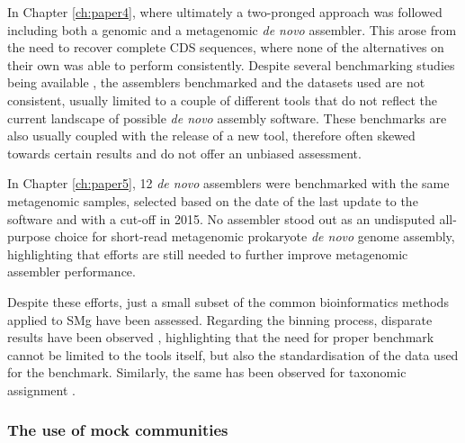 In Chapter \ref{ch:paper4}, where ultimately a two-pronged approach was followed including both a genomic and a metagenomic \textit{de novo} assembler. This arose from the need to recover complete CDS sequences, where none of the alternatives on their own was able to perform consistently. Despite several benchmarking studies being available \citep{miller_assembly_2010, earl_assemblathon_2011, bradnam_assemblathon_2013, liao_current_2019, chen_benchmarking_2020, sczyrba_critical_2017, meyer_critical_2022}, the assemblers benchmarked and the datasets used are not consistent, usually limited to a couple of different tools that do not reflect the current landscape of possible \textit{de novo} assembly software. These benchmarks are also usually coupled with the release of a new tool, therefore often skewed towards certain results and do not offer an unbiased assessment. 

In Chapter \ref{ch:paper5}, 12 \textit{de novo} assemblers were benchmarked with the same metagenomic samples, selected based on the date of the last update to the software and with a cut-off in 2015. No assembler stood out as an undisputed all-purpose choice for short-read metagenomic prokaryote \textit{de novo} genome assembly, highlighting that efforts are still needed to further improve metagenomic assembler performance. 

Despite these efforts, just a small subset of the common bioinformatics methods applied to \ac{SMg} have been assessed. Regarding the binning process, disparate results have been observed \citep{bharti_current_2021, yue_evaluating_2020, yang_review_2021, sczyrba_critical_2017}, highlighting that the need for proper benchmark cannot be limited to the tools itself, but also the standardisation of the data used for the benchmark. Similarly, the same has been observed for taxonomic assignment \citep{sczyrba_critical_2017,ye_benchmarking_2019, tamames_assessing_2019}.

\subsubsection{The use of mock communities}

